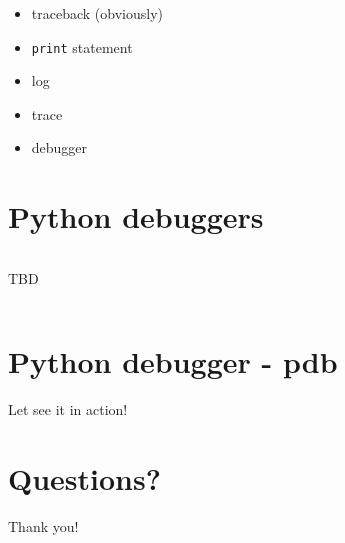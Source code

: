 \documentclass[14pt,notes,svgnames,aspectratio=1610]{beamer}
\begin{document}
\begin{frame}
    \begin{itemize}
        \item{traceback (obviously)}
        \pause
        \item \lstinline{print} statement
        \pause
        \item log
        \pause
        \item trace
        \pause
        \item debugger
    \end{itemize}
\end{frame}

\begingroup
    \section{Python debuggers}
\endgroup

\begin{frame}
    \begin{columns}
        TBD
    \end{columns}
\end{frame}

\begingroup
    \section{Python debugger - pdb}
\endgroup

\begin{frame}
    \centerline{\Large Let see it in action!}
\end{frame}

\begingroup
    \section{Questions?}
\endgroup

\begin{frame}
    \centerline{\Large Thank you!}
\end{frame}
\end{document}
